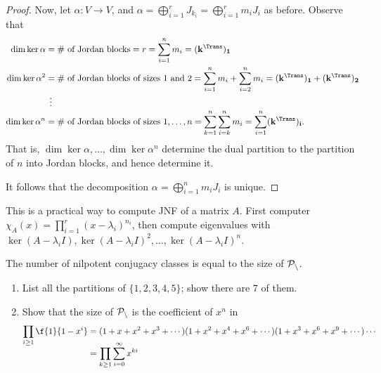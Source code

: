\begin{proof}
	Now, let $\alpha:V\to V$, and $\alpha=\bigoplus_{i=1}^r J_{k_i} = \bigoplus_{i=1}^r m_i J_i$ as before. Observe that %
	\begin{align*}
		\dim\ker\alpha
		&= \# \text{ of Jordan blocks}
		 = r
		 = \sum_{i=1}^n m_i
		 = (\bf{k}^\Trans)_1 \\
		\dim\ker\alpha^2
		&= \# \text{ of Jordan blocks of sizes 1 and 2}
		 = \sum_{i=1}^n m_i + \sum_{i=2}^n m_i
		 = (\bf{k}^\Trans)_1 + (\bf{k}^\Trans)_2 \\[-3pt]
		 &\;\,\vdots \\[-3pt]
		\dim\ker\alpha^n
		&= \# \text{ of Jordan blocks of sizes 1,}\ldots,n
		 = \sum_{k=1}^n \sum_{i=k}^n m_i
		 = \sum_{i=1}^n (\bf{k}^\Trans)_i.
	\end{align*}
	That is, $\dim \ker\alpha,\ldots,\dim\ker\alpha^n$ determine the dual partition to the partition of $n$ into Jordan blocks, and hence determine it. %
	 
	It follows that the decomposition $\alpha=\bigoplus_{i=1}^n m_i J_i$ is unique.
\end{proof}
\vspace{3pt}
\begin{remark}
	This is a practical way to compute JNF of a matrix $A$. First computer $\chi_A(x)=\prod_{i=1}^r \left( x-\lambda_i \right)^{n_i}$, then compute eigenvalues with $\ker(A-\lambda_iI), \ker\left( A-\lambda_iI \right)^2,\ldots,\ker\left( A-\lambda_iI \right)^n$. %
\end{remark}

\vspace{3pt}
\begin{corollary}
	The number of nilpotent conjugacy classes is equal to the size of $\cal{P}_n$. %
\end{corollary}
\vspace{-6pt}
\begin{exercises}
\mbox{}
\begin{enumerate}
	\shortskip
	\item List all the partitions of $\{1,2,3,4,5\}$; show there are $7$ of them.
	\item Show that the size of $\cal{P}_n$ is the coefficient of $x^n$ in %
	\begin{align*}
		\prod_{i\geq 1} \f{1}{1-x^i}
		&= (1 + x + x^2 + x^3 + \cdots)(1+x^2 + x^4 + x^6 + \cdots)(1 + x^3 + x^6 + x^9 + \cdots)\cdots \\[-9pt] %
		&= \prod_{k\geq 1} \sum_{i=0}^\infty x^{ki}
	\end{align*}
\end{enumerate}
\end{exercises}

